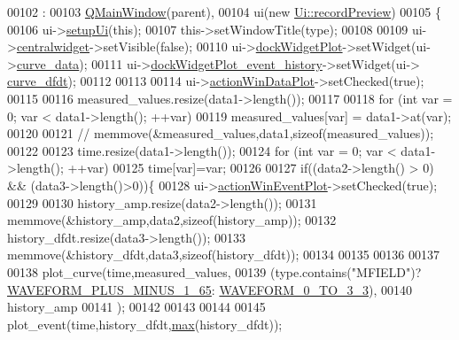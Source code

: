 \begin{DoxyCode}
00102                                                                                                            
                             :
00103     \hyperlink{a00010}{QMainWindow}(parent),
00104     ui(\textcolor{keyword}{new} \hyperlink{a00021}{Ui::recordPreview})
00105 \{
00106     ui->\hyperlink{a00028_afa41dc070a896a5eae476f3c0206825c}{setupUi}(\textcolor{keyword}{this});
00107     this->setWindowTitle(type);
00108 
00109     ui->\hyperlink{a00028_ac9ab4609922159e8e4cc45905f76928e}{centralwidget}->setVisible(\textcolor{keyword}{false});
00110     ui->\hyperlink{a00028_a07b76f17803ec09e0367b72938bbd097}{dockWidgetPlot}->setWidget(ui->\hyperlink{a00028_a247d94481323c0bc4f8b6458a8a535dd}{curve\_data});
00111     ui->\hyperlink{a00028_a2a8f7ee8d4458dd20481c8a1c29ce185}{dockWidgetPlot\_event\_history}->setWidget(ui->
      \hyperlink{a00028_a43d24fa14d90cc27b310542e39dcdd1b}{curve\_dfdt});
00112 
00113 
00114     ui->\hyperlink{a00028_aa09067a9c96c9cd78f75261a9fcb89f0}{actionWinDataPlot}->setChecked(\textcolor{keyword}{true});
00115 
00116     measured\_values.resize(data1->length());
00117 
00118     \textcolor{keywordflow}{for} (\textcolor{keywordtype}{int} var = 0; var < data1->length(); ++var)
00119       measured\_values[var] = data1->at(var);
00120 
00121    \textcolor{comment}{// memmove(&measured\_values,data1,sizeof(measured\_values));}
00122 
00123     time.resize(data1->length());
00124     \textcolor{keywordflow}{for} (\textcolor{keywordtype}{int} var = 0; var < data1->length(); ++var)
00125         time[var]=var;
00126 
00127     \textcolor{keywordflow}{if}((data2->length() > 0) && (data3->length()>0))\{
00128         ui->\hyperlink{a00028_ac72ec9c8679d46fd43a87f99ee6db893}{actionWinEventPlot}->setChecked(\textcolor{keyword}{true});
00129 
00130         history\_amp.resize(data2->length());
00131         memmove(&history\_amp,data2,\textcolor{keyword}{sizeof}(history\_amp));
00132         history\_dfdt.resize(data3->length());
00133         memmove(&history\_dfdt,data3,\textcolor{keyword}{sizeof}(history\_dfdt));
00134 
00135 
00136 
00137 
00138         plot\_curve(time,measured\_values,
00139                   (type.contains(\textcolor{stringliteral}{"MFIELD"})?\hyperlink{a00034_a0923d3b365a36e1e8c401cec964aa36f}{WAVEFORM\_PLUS\_MINUS\_1\_65}:
      \hyperlink{a00034_ae18fed2471b16a8516d721ff60671dd9}{WAVEFORM\_0\_TO\_3\_3}),
00140                   history\_amp
00141                   );
00142 
00143 
00144 
00145         plot\_event(time,history\_dfdt,\hyperlink{a00020_ad38222699419e6ac871ce2a23c6d292e}{max}(history\_dfdt));

\end{DoxyCode}
